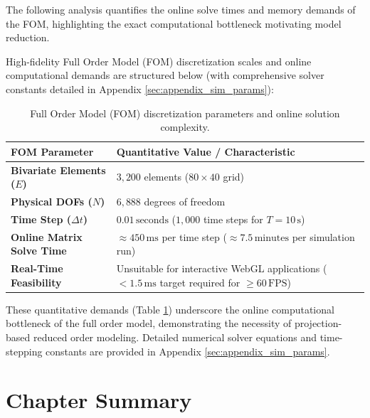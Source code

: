 The following analysis quantifies the online solve times and memory demands of the FOM, highlighting the exact computational bottleneck motivating model reduction.

High-fidelity Full Order Model (FOM) discretization scales and online computational demands are structured below (with comprehensive solver constants detailed in Appendix \ref{sec:appendix_sim_params}):

\begin{table}[htbp]
    \centering
    \caption{Full Order Model (FOM) discretization parameters and online solution complexity.}
    \label{tab:fom_parameters}
    \begin{tabular}{l p{9.0cm}}
        \toprule
        \textbf{FOM Parameter}            & \textbf{Quantitative Value / Characteristic}                                              \\
        \midrule
        \textbf{Bivariate Elements ($E$)} & $3,200$ elements ($80 \times 40$ grid)                                                    \\
        \textbf{Physical DOFs ($N$)}      & $6,888$ degrees of freedom                                                                \\
        \textbf{Time Step ($\Delta t$)}   & $0.01\,\text{seconds}$ ($1,000$ time steps for $T=10\,\text{s}$)                          \\
        \textbf{Online Matrix Solve Time} & $\approx 450\,\text{ms}$ per time step ($\approx 7.5\,\text{minutes}$ per simulation run) \\
        \textbf{Real-Time Feasibility}    & Unsuitable for interactive WebGL applications ($<1.5\,\text{ms}$ target required for $\ge 60\,\text{FPS}$) \\
        \bottomrule
    \end{tabular}
\end{table}

These quantitative demands (Table \ref{tab:fom_parameters}) underscore the online computational bottleneck of the full order model, demonstrating the necessity of projection-based reduced order modeling. Detailed numerical solver equations and time-stepping constants are provided in Appendix \ref{sec:appendix_sim_params}.

\section{Chapter Summary}

